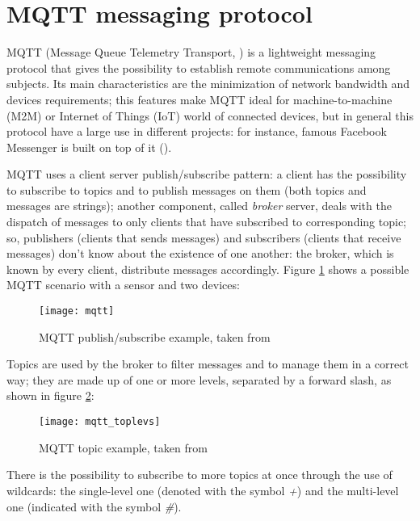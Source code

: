 \section{MQTT messaging protocol}\label{mqtt}

MQTT (Message Queue Telemetry Transport, \cite{banks2014mqtt}) is a lightweight messaging protocol that gives the possibility to establish remote communications among subjects. Its main characteristics are the minimization of network bandwidth and devices requirements; this features make MQTT ideal for machine-to-machine (M2M) or Internet of Things (IoT) world of connected devices, but in general this protocol have a large use in different projects: for instance, famous Facebook Messenger is built on top of it (\cite{zhang2011building}).

MQTT uses a client server publish\slash{}subscribe pattern: a client has the possibility to subscribe to topics and to publish messages on them (both topics and messages are strings); another component, called \textit{broker} server, deals with the dispatch of messages to only clients that have subscribed to corresponding topic; so, publishers (clients that sends messages) and subscribers (clients that receive messages) don't know about the existence of one another: the broker, which is known by every client, distribute messages accordingly. Figure \ref{fig::mqtt_example} shows a possible MQTT scenario with a sensor and two devices:

\begin{figure}[H]

    \centering
    \texttt{[image: mqtt]}
    \caption{MQTT publish/subscribe example, taken from \cite{site:hivemq}}
    \label{fig::mqtt_example}

\end{figure}

Topics are used by the broker to filter messages and to manage them in a correct way; they are made up of one or more levels, separated by a forward slash, as shown in figure \ref{fig::topic}:

\begin{figure}[H]

    \centering
    \texttt{[image: mqtt\_toplevs]}
    \caption{MQTT topic example, taken from \cite{site:hivemq}}
    \label{fig::topic}

\end{figure}

There is the possibility to subscribe to more topics at once through the use of wildcards: the single-level one (denoted with the symbol \textit{+}) and the multi-level one (indicated with the symbol \textit{\#}).

